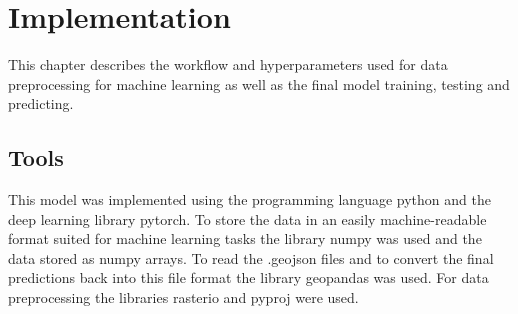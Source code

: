 \section{Implementation}
This chapter describes the workflow and hyperparameters used for data preprocessing for machine learning as well as the final model training, testing and predicting.
\subsection{Tools}
This model was implemented using the programming language python and the deep learning library pytorch. To store the data in an easily machine-readable format suited for machine learning tasks the library numpy was used and the data stored as numpy arrays. To read the .geojson files and to convert the final predictions back into this file format the library geopandas was used. For data preprocessing the libraries rasterio and pyproj were used. 
